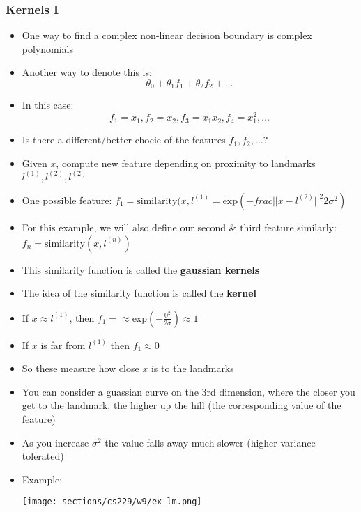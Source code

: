 \subsubsection{Kernels I}
\begin{itemize}[--]
	\item One way to find a complex non-linear decision boundary is complex polynomials
	\item Another way to denote this is:
		$$\theta_0 + \theta_1 f_1 + \theta_2 f_2 + \ldots$$
	\item In this case:
		$$f_1=x_1, f_2=x_2, f_3=x_1 x_2, f_4=x_1^2, \ldots$$
	\item Is there a different/better chocie of the features $f_1, f_2,\ldots$?
	\item Given $x$, compute new feature depending on proximity to landmarks $l^{(1)}, l^{(2)}, l^{(2)}$
	\item One possible feature: $f_1=\text{similarity}(x,l^{(1)}=\text{exp}(-frac{||x-l^{(2)}||^2}{2\sigma^2})$
	\item For this example, we will also define our second \& third feature similarly: $f_n=\text{similarity}(x,l^{(n)})$
	\item This similarity function is called the \textbf{gaussian kernels}
	\item The idea of the similarity function is called the \textbf{kernel}
	\item If $x\approx l^{(1)}$, then $f_1=\approx \text{exp}(-\frac{0^2}{2\sigma})\approx 1$
	\item If $x$ is far from $l^{(1)}$ then $f_1\approx 0$
	\item So these measure how close $x$ is to the landmarks
	\item You can consider a guassian curve on the 3rd dimension, where the closer you get to the landmark, the higher up the hill (the corresponding value of the feature)
	\item As you increase $\sigma^2$ the value falls away much slower (higher variance tolerated)
	\item Example:
	\begin{center}
		\texttt{[image: sections/cs229/w9/ex\_lm.png]}
	\end{center}
\end{itemize}

